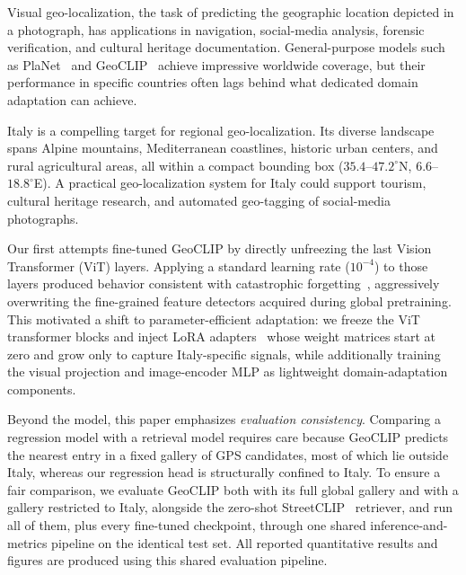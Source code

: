 \documentclass[10pt,twocolumn,letterpaper]{article}
\begin{document}
Visual geo-localization, the task of predicting the geographic location
depicted in a photograph, has applications in navigation, social-media
analysis, forensic verification, and cultural heritage documentation.
General-purpose models such as PlaNet~\cite{planet} and
GeoCLIP~\cite{geoclip} achieve impressive worldwide coverage, but their
performance in specific countries often lags behind what dedicated domain
adaptation can achieve.

Italy is a compelling target for regional geo-localization.
Its diverse landscape spans Alpine mountains, Mediterranean coastlines, historic
urban centers, and rural agricultural areas, all within a compact bounding box
($35.4$--$47.2^\circ$N, $6.6$--$18.8^\circ$E).
A practical geo-localization system for Italy could support tourism, cultural
heritage research, and automated geo-tagging of social-media photographs.

Our first attempts fine-tuned GeoCLIP by directly unfreezing the last Vision
Transformer (ViT) layers. Applying a standard learning rate ($10^{-4}$) to those
layers produced behavior consistent with catastrophic
forgetting~\cite{catastrophic_forgetting}, aggressively overwriting the
fine-grained feature detectors acquired during global pretraining.
This motivated a shift to parameter-efficient adaptation: we freeze the ViT
transformer blocks and inject LoRA adapters~\cite{lora} whose weight matrices
start at zero and grow only to capture Italy-specific signals, while additionally
training the visual projection and image-encoder MLP as lightweight
domain-adaptation components.

Beyond the model, this paper emphasizes \emph{evaluation consistency}.
Comparing a regression model with a retrieval model requires care because
GeoCLIP predicts the nearest entry in a fixed gallery of GPS candidates, most of
which lie outside Italy, whereas our regression head is structurally confined to
Italy. To ensure a fair comparison, we evaluate GeoCLIP both with its full global
gallery and with a gallery restricted to Italy, alongside the zero-shot
StreetCLIP~\cite{streetclip} retriever, and run all of them, plus every
fine-tuned checkpoint, through one shared inference-and-metrics pipeline on the
identical test set. All reported quantitative results and figures are produced
using this shared evaluation pipeline.
\end{document}
